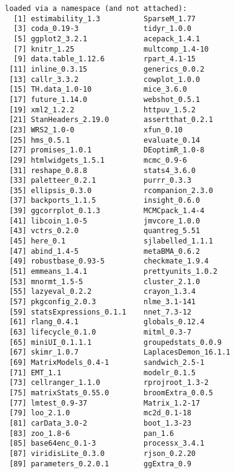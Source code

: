 \documentclass[]{article}
\begin{document}
\begin{verbatim}
loaded via a namespace (and not attached):
  [1] estimability_1.3          SparseM_1.77             
  [3] coda_0.19-3               tidyr_1.0.0              
  [5] ggplot2_3.2.1             acepack_1.4.1            
  [7] knitr_1.25                multcomp_1.4-10          
  [9] data.table_1.12.6         rpart_4.1-15             
 [11] inline_0.3.15             generics_0.0.2           
 [13] callr_3.3.2               cowplot_1.0.0            
 [15] TH.data_1.0-10            mice_3.6.0               
 [17] future_1.14.0             webshot_0.5.1            
 [19] xml2_1.2.2                httpuv_1.5.2             
 [21] StanHeaders_2.19.0        assertthat_0.2.1         
 [23] WRS2_1.0-0                xfun_0.10                
 [25] hms_0.5.1                 evaluate_0.14            
 [27] promises_1.0.1            DEoptimR_1.0-8           
 [29] htmlwidgets_1.5.1         mcmc_0.9-6               
 [31] reshape_0.8.8             stats4_3.6.0             
 [33] paletteer_0.2.1           purrr_0.3.3              
 [35] ellipsis_0.3.0            rcompanion_2.3.0         
 [37] backports_1.1.5           insight_0.6.0            
 [39] ggcorrplot_0.1.3          MCMCpack_1.4-4           
 [41] libcoin_1.0-5             jmvcore_1.0.0            
 [43] vctrs_0.2.0               quantreg_5.51            
 [45] here_0.1                  sjlabelled_1.1.1         
 [47] abind_1.4-5               metaBMA_0.6.2            
 [49] robustbase_0.93-5         checkmate_1.9.4          
 [51] emmeans_1.4.1             prettyunits_1.0.2        
 [53] mnormt_1.5-5              cluster_2.1.0            
 [55] lazyeval_0.2.2            crayon_1.3.4             
 [57] pkgconfig_2.0.3           nlme_3.1-141             
 [59] statsExpressions_0.1.1    nnet_7.3-12              
 [61] rlang_0.4.1               globals_0.12.4           
 [63] lifecycle_0.1.0           mitml_0.3-7              
 [65] miniUI_0.1.1.1            groupedstats_0.0.9       
 [67] skimr_1.0.7               LaplacesDemon_16.1.1     
 [69] MatrixModels_0.4-1        sandwich_2.5-1           
 [71] EMT_1.1                   modelr_0.1.5             
 [73] cellranger_1.1.0          rprojroot_1.3-2          
 [75] matrixStats_0.55.0        broomExtra_0.0.5         
 [77] lmtest_0.9-37             Matrix_1.2-17            
 [79] loo_2.1.0                 mc2d_0.1-18              
 [81] carData_3.0-2             boot_1.3-23              
 [83] zoo_1.8-6                 pan_1.6                  
 [85] base64enc_0.1-3           processx_3.4.1           
 [87] viridisLite_0.3.0         rjson_0.2.20             
 [89] parameters_0.2.0.1        ggExtra_0.9              

\end{verbatim}
\end{document}
